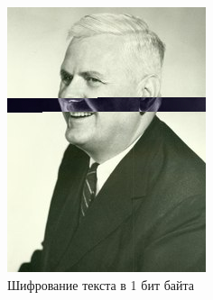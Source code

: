 \documentclass[10pt,a4paper,final]{article} %
\begin{document}
\begin{figure}[h!]
\begin{minipage}{0.3\textwidth}
		\includegraphics[width=\linewidth]{img/Haskell_1 (1)}
		\caption{Шифрование текста в 1 бит байта}
	\end{minipage}
	\hspace{0.02\textwidth}
	\begin{minipage}{0.3\textwidth}
		\centering

\end{minipage}
\end{figure}
\end{document}
